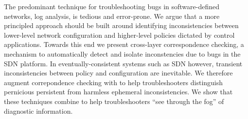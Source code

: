 The predominant technique for troubleshooting bugs in software-defined networks,
log analysis, is tedious and error-prone. We argue that a more principled
approach should be built around identifying inconsistencies between lower-level
network configuration and higher-level policies dictated by control
applications. Towards this end we present
cross-layer correspondence checking, a mechanism to automatically detect and
isolate inconstencies due to bugs in the SDN platform. In
eventually-consistent systems such as SDN however,
transient inconsistencies between policy and configuration are inevitable.
We therefore augment correpondence checking with \simulator to help troubleshooters
distinguish pernicious persistent from harmless ephemeral inconsistencies. We
show that these techniques combine to help troubleshooters ``see through the fog'' of
diagnostic information.
